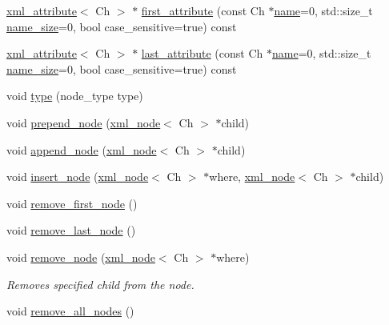\begin{DoxyCompactItemize}
\item 
\hyperlink{classrapidxml_1_1xml__attribute}{xml\-\_\-attribute}$<$ Ch $>$ $\ast$ \hyperlink{classrapidxml_1_1xml__node_ae426802be58114ffc41bf30ac6b8c37d}{first\-\_\-attribute} (const Ch $\ast$\hyperlink{classrapidxml_1_1xml__base_a9a09739310469995db078ebd0da3ed45}{name}=0, std\-::size\-\_\-t \hyperlink{classrapidxml_1_1xml__base_a7e7f98b3d01e1eab8dc1ca69aad9af84}{name\-\_\-size}=0, bool case\-\_\-sensitive=true) const 
\item 
\hyperlink{classrapidxml_1_1xml__attribute}{xml\-\_\-attribute}$<$ Ch $>$ $\ast$ \hyperlink{classrapidxml_1_1xml__node_a50c03f2db3fa51f27a73d86ec29a49d3}{last\-\_\-attribute} (const Ch $\ast$\hyperlink{classrapidxml_1_1xml__base_a9a09739310469995db078ebd0da3ed45}{name}=0, std\-::size\-\_\-t \hyperlink{classrapidxml_1_1xml__base_a7e7f98b3d01e1eab8dc1ca69aad9af84}{name\-\_\-size}=0, bool case\-\_\-sensitive=true) const 
\item 
void \hyperlink{classrapidxml_1_1xml__node_a499bbc9300c1b06821d5c08b24164c68}{type} (node\-\_\-type type)
\item 
void \hyperlink{classrapidxml_1_1xml__node_ae86e92908c3eab40bbed8216e4f3f3cb}{prepend\-\_\-node} (\hyperlink{classrapidxml_1_1xml__node}{xml\-\_\-node}$<$ Ch $>$ $\ast$child)
\item 
void \hyperlink{classrapidxml_1_1xml__node_a8696d098ecc9c4d2a646b43e91d58e31}{append\-\_\-node} (\hyperlink{classrapidxml_1_1xml__node}{xml\-\_\-node}$<$ Ch $>$ $\ast$child)
\item 
void \hyperlink{classrapidxml_1_1xml__node_a666880f42a7e486d78cc45ed51c7c46d}{insert\-\_\-node} (\hyperlink{classrapidxml_1_1xml__node}{xml\-\_\-node}$<$ Ch $>$ $\ast$where, \hyperlink{classrapidxml_1_1xml__node}{xml\-\_\-node}$<$ Ch $>$ $\ast$child)
\item 
void \hyperlink{classrapidxml_1_1xml__node_a62bf7b276cf7a651a3337f5e0a0ef6ac}{remove\-\_\-first\-\_\-node} ()
\item 
void \hyperlink{classrapidxml_1_1xml__node_a9182512e948ec451a83f116cce7c7674}{remove\-\_\-last\-\_\-node} ()
\item 
\hypertarget{classrapidxml_1_1xml__node_a98289923eb9e8889418a9eb0207ea35c}{void \hyperlink{classrapidxml_1_1xml__node_a98289923eb9e8889418a9eb0207ea35c}{remove\-\_\-node} (\hyperlink{classrapidxml_1_1xml__node}{xml\-\_\-node}$<$ Ch $>$ $\ast$where)}\label{classrapidxml_1_1xml__node_a98289923eb9e8889418a9eb0207ea35c}

\begin{DoxyCompactList}\small\item\em Removes specified child from the node. \end{DoxyCompactList}\item 
\hypertarget{classrapidxml_1_1xml__node_a95735358b079ae0adcfbbac69aa1fbc3}{void \hyperlink{classrapidxml_1_1xml__node_a95735358b079ae0adcfbbac69aa1fbc3}{remove\-\_\-all\-\_\-nodes} ()}\label{classrapidxml_1_1xml__node_a95735358b079ae0adcfbbac69aa1fbc3}


\end{DoxyCompactItemize}
